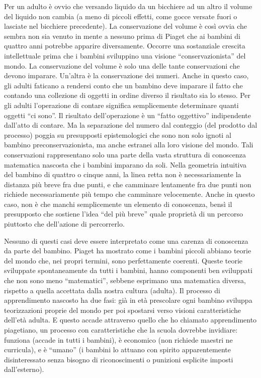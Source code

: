 Per un adulto è ovvio che versando liquido da un bicchiere ad un altro il volume del liquido non cambia (a meno di piccoli effetti, come gocce versate fuori o lasciate nel bicchiere precedente). La conservazione del volume è così ovvia che sembra non sia venuto in mente a nessuno prima di Piaget che ai bambini di quattro anni potrebbe apparire diversamente. Occorre una sostanziale crescita intellettuale prima che i bambini sviluppino una visione “conservazionista” del mondo. La conservazione del volume è solo una delle tante conservazioni che devono imparare.  Un'altra è la conservazione dei numeri. Anche in questo caso, gli adulti faticano a rendersi conto che un bambino   deve imparare il fatto che contando una collezione di oggetti in ordine diverso il risultato sia lo stesso. Per gli adulti l'operazione di contare significa semplicemente determinare quanti oggetti “ci sono”. Il risultato dell'operazione è un “fatto oggettivo” indipendente dall'atto di contare. Ma la separazione del numero dal conteggio (del prodotto dal processo) poggia su presupposti epistemologici che sono non solo ignoti al bambino preconservazionista, ma anche estranei alla loro visione del mondo. Tali conservazioni rappresentano solo una parte della vasta struttura di conoscenza matematica nascosta che i bambini imparano da soli. Nella geometria intuitiva del bambino di quattro o cinque anni, la linea retta non è necessariamente la distanza più breve fra due punti, e che camminare lentamente fra due punti non richiede necessariamente più tempo che camminare velocemente. Anche in questo caso, non è che manchi semplicemente un elemento di conoscenza, bensì il presupposto che sostiene l'idea “del più breve” quale proprietà di un percorso piuttosto che dell'azione di percorrerlo.

Nessuno di questi casi deve essere interpretato come una carenza di conoscenza da parte del bambino. Piaget ha mostrato come i bambini piccoli abbiano teorie del mondo che, nei propri termini, sono perfettamente coerenti. Queste teorie sviluppate spontaneamente da tutti i bambini, hanno componenti ben sviluppati che non sono meno “matematici”, sebbene esprimano una matematica diversa, rispetto a quella accettata dalla nostra cultura (adulta). Il processo di apprendimento nascosto ha due fasi: già in età prescolare ogni bambino sviluppa teorizzazioni proprie del mondo per poi spostarsi verso visioni caratteristiche dell'età adulta. E questo accade attraverso quello che ho chiamato apprendimento piagetiano, un processo con caratteristiche che la scuola dovrebbe invidiare: funziona (accade in tutti i bambini), è economico (non richiede maestri ne curricula), e è “umano” (i bambini lo attuano con spirito apparentemente disinteressato senza bisogno di riconoscimenti o punizioni esplicite imposti dall'esterno).  

